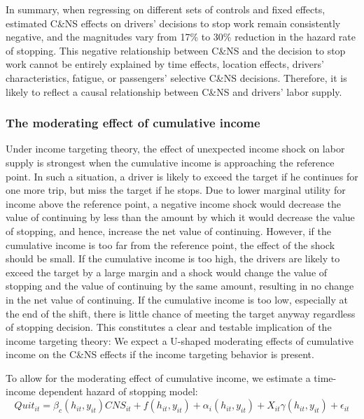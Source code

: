 \documentclass[reviewmode,AEJ]{AEA}
\begin{document}
In summary, when regressing on different sets of controls and fixed effects, estimated C\&NS effects on
drivers' decisions to stop work remain consistently negative, and the magnitudes vary
from 17\% to 30\% reduction in the hazard rate of stopping. This negative relationship between C\&NS and the decision to stop work cannot
be entirely explained by time effects, location effects, drivers' characteristics, fatigue, or passengers' 
selective C\&NS decisions. Therefore, it is likely to reflect a causal relationship between C\&NS and 
drivers' labor supply.


\subsubsection{The moderating effect of cumulative income} Under income targeting theory, the effect of unexpected income shock on labor supply is strongest when the cumulative income is approaching the reference point. In such a situation, a driver is likely to exceed the target if he continues for one more trip, but  miss the target if he stops. Due to lower marginal utility for income above the reference point, a negative income shock would decrease the value of continuing by less than the amount by which it would decrease the value of stopping, and hence, increase the net value of continuing. However, if the cumulative income is too far from the reference point, the effect of the shock should be small. If the cumulative income is too high, the drivers are likely to exceed the target by a large margin and a shock would change the value of stopping and the value of continuing by the same amount, resulting in no change in the net value of continuing. If the cumulative income is too low, especially at the end of the shift, there is little chance of meeting the target anyway regardless of stopping decision. This constitutes a clear and testable implication of the income targeting theory: We expect a U-shaped moderating effects of cumulative income on the C\&NS effects if the income targeting behavior is present.

To allow for the moderating effect of cumulative income, we estimate a time-income dependent hazard of stopping model:
\begin{equation}
    \label{eq:2dlwr}
    Quit_{it} = \beta_c(h_{it}, y_{it}) {CNS}_{it} + f(h_{it}, y_{it}) + \alpha_{i}(h_{it}, y_{it}) + X_{it}\gamma(h_{it}, y_{it}) + \epsilon_{it}
\end{equation}
\end{document}
